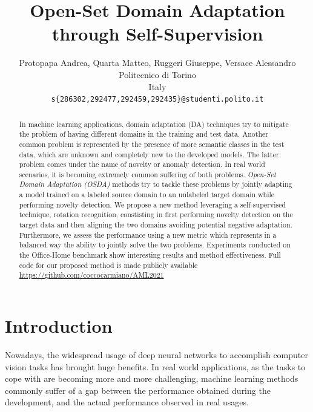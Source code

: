 \documentclass[10pt,twocolumn,letterpaper]{article}
\begin{document}
\title{Open-Set Domain Adaptation through Self-Supervision}

\author{Protopapa Andrea, Quarta Matteo, Ruggeri Giuseppe, Versace Alessandro\\
Politecnico di Torino\\
Italy\\
{\tt\small s\{286302,292477,292459,292435\}@studenti.polito.it}
}
\maketitle

\begin{abstract}
  In machine learning applications, domain adaptation (DA) techniques try to mitigate the problem of having different domains in the training and test data.
  Another common problem is represented by the presence of more semantic classes in the test data, which are unknown
  and completely new to the developed models. The latter problem comes under the name of novelty or anomaly detection.
  In real world scenarios, it is becoming extremely common suffering of both problems.
  \textit{Open-Set Domain Adaptation (OSDA)} methods try to tackle these problems by jointly adapting a model trained on a labeled source domain to an unlabeled target domain
  while performing novelty detection. We propose a new method leveraging a self-supervised technique, rotation recognition, constisting in first performing
  novelty detection on the target data and then aligning the two domains avoiding potential negative adaptation.
  Furthermore, we assess the performance using a new metric which represents in a balanced way the ability to jointly solve the two problems.
  Experiments conducted on the Office-Home benchmark show interesting results and method effectiveness.
  Full code for our proposed method is made publicly available \url{https://github.com/coccocarmiano/AML2021}
\end{abstract}

\section{Introduction}
\label{sec:intro}
Nowadays, the widespread usage of deep neural networks to accomplish computer vision tasks has brought huge benefits.
In real world applications, as the tasks to cope with are becoming more and more challenging, machine learning methods commonly suffer of a gap between the performance
obtained during the development, and the actual performance observed in real usages. 
\end{document}
